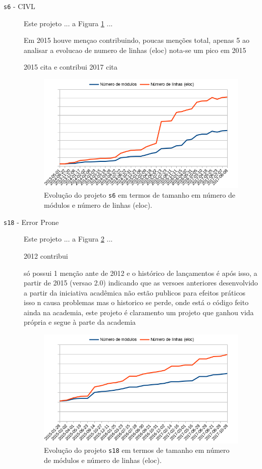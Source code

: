 \begin{description}

  \item[\texttt{s6} - CIVL]
    Este projeto ... a Figura \ref{modules-eloc-s6} ...

Em 2015 houve mençao contribuindo, poucas menções total, apenas 5
ao analisar a evolucao de numero de linhas (eloc) nota-se um pico em 2015


2015	cita e contribui
2017	cita

\begin{figure}[h]
  \centering
  \includegraphics[scale=0.6]{imagens/modules-eloc-s6.png}
  \caption{Evolução do projeto \texttt{s6} em termos de tamanho em número de módulos e número de linhas (eloc).}
  \label{modules-eloc-s6}
\end{figure}

  \item[\texttt{s18} - Error Prone]
    Este projeto ... a Figura \ref{modules-eloc-s18} ...

2012	contribui

só possui 1 menção ante de 2012 e o histórico de lançamentos
é após isso, a partir de 2015  (versao 2.0) indicando que as versoes
anteriores desenvolvido a partir da iniciativa acadêmica não estão publicos
para efeitos práticos isso n causa problemas mas o historico se perde, onde está o
código feito ainda na academia, este projeto é claramento um projeto que
ganhou vida própria e segue à parte da academia

\begin{figure}[h]
  \centering
  \includegraphics[scale=0.6]{imagens/modules-eloc-s18.png}
  \caption{Evolução do projeto \texttt{s18} em termos de tamanho em número de módulos e número de linhas (eloc).}
  \label{modules-eloc-s18}
\end{figure}


\end{description}
